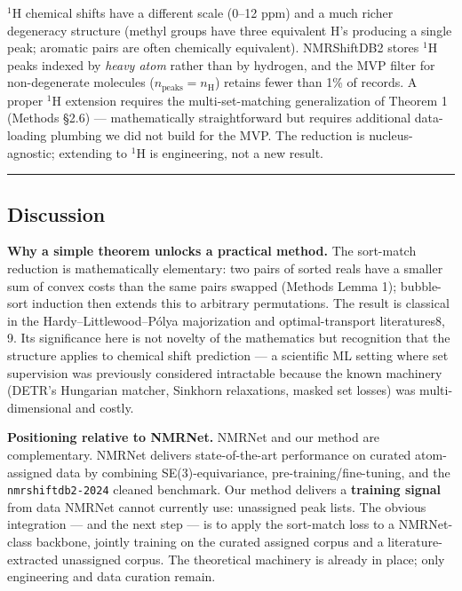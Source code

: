 \documentclass[
]{article}
\begin{document}
\(^1\)H chemical shifts have a different scale (0--12 ppm) and a much
richer degeneracy structure (methyl groups have three equivalent H's
producing a single peak; aromatic pairs are often chemically
equivalent). NMRShiftDB2 stores \(^1\)H peaks indexed by \emph{heavy
atom} rather than by hydrogen, and the MVP filter for non-degenerate
molecules (\(n_{\text{peaks}} = n_{\text{H}}\)) retains fewer than 1\%
of records. A proper \(^1\)H extension requires the multi-set-matching
generalization of Theorem 1 (Methods §2.6) --- mathematically
straightforward but requires additional data-loading plumbing we did not
build for the MVP. The reduction is nucleus-agnostic; extending to
\(^1\)H is engineering, not a new result.

\begin{center}\rule{0.5\linewidth}{0.5pt}\end{center}

\subsection{Discussion}\label{discussion}

\textbf{Why a simple theorem unlocks a practical method.} The sort-match
reduction is mathematically elementary: two pairs of sorted reals have a
smaller sum of convex costs than the same pairs swapped (Methods Lemma
1); bubble-sort induction then extends this to arbitrary permutations.
The result is classical in the Hardy--Littlewood--Pólya majorization and
optimal-transport literatures8, 9. Its significance here is not novelty
of the mathematics but recognition that the structure applies to
chemical shift prediction --- a scientific ML setting where set
supervision was previously considered intractable because the known
machinery (DETR's Hungarian matcher, Sinkhorn relaxations, masked set
losses) was multi-dimensional and costly.

\textbf{Positioning relative to NMRNet.} NMRNet and our method are
complementary. NMRNet delivers state-of-the-art performance on curated
atom-assigned data by combining SE(3)-equivariance,
pre-training/fine-tuning, and the \texttt{nmrshiftdb2-2024} cleaned
benchmark. Our method delivers a \textbf{training signal} from data
NMRNet cannot currently use: unassigned peak lists. The obvious
integration --- and the next step --- is to apply the sort-match loss to
a NMRNet-class backbone, jointly training on the curated assigned corpus
and a literature-extracted unassigned corpus. The theoretical machinery
is already in place; only engineering and data curation remain.
\end{document}
